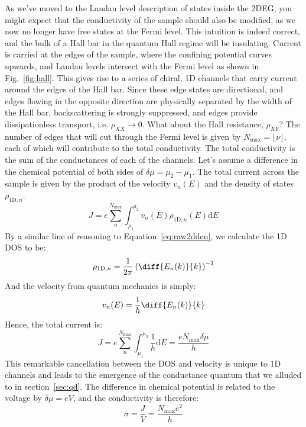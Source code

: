 As we've moved to the Landau level description of states inside the 2DEG, you might expect that the conductivity of the sample should also
be modified, as we now no longer have free states at the Fermi level. This intuition is indeed correct, and the bulk of a Hall bar in the quantum
Hall regime will be insulating. Current is carried at the edges of the sample, where the confining potential curves upwards, and Landau levels
intersect with the Fermi level \cite{PhysRevB.25.2185} as shown in Fig.~\ref{fig:hall}. This gives rise to a series of chiral, 1D channels that carry current around the edges
of the Hall bar. Since these edge states are directional, and edges flowing in the opposite direction are physically separated by the width of the Hall
bar, backscattering is strongly suppressed, and edges provide dissipationless transport, i.e. $\rho_{XX} \rightarrow 0$. What about
the Hall resistance, $\rho_{XY}$? The number of edges that will cut through the Fermi level is given by $N_\textrm{max} = \lfloor \nu \rfloor$, each of which
will contribute to the total conductivity. The total conductivity is the sum of the conductances of each of the channels. Let's assume a difference in the
chemical potential of both sides of $\delta \mu = \mu_2 - \mu_1$. The total current across the sample is given by the product of the velocity $v_n(E)$ and the density of states $\rho_{\textrm{1D},n}$.
\begin{equation}
  J = e\sum_n^{N_{\textrm{max}}} \int_{\mu_1}^{\mu_2} v_n(E)\rho_{\textrm{1D},n}(E) \mathrm{d}E
\end{equation}
By a similar line of reasoning to Equation~\ref{eq:raw2dden}, we calculate the 1D DOS to be:
\begin{equation}
  \rho_{\textrm{1D},n} = \frac{1}{2\pi}\left(\diff{E_n(k)}{k}\right)^{-1}
\end{equation}
And the velocity from quantum mechanics is simply:
\begin{equation}
  v_n(E) = \frac{1}{\hbar}\diff{E_n(k)}{k}
\end{equation}
Hence, the total current is:
\begin{equation}
  J = e\sum_n^{N_{\textrm{max}}} \int_{\mu_1}^{\mu_2} \frac{1}{h} \mathrm{d}E = \frac{e N_{\textrm{max}} \delta\mu}{h}
\end{equation}
This remarkable cancellation between the DOS and velocity is unique to 1D channels and leads to the emergence of the conductance quantum that
we alluded to in section~\ref{sec:qd}. The difference in chemical potential is related to the voltage by $\delta \mu = eV$, and the conductivity is therefore:
\begin{equation}
  \sigma = \frac{J}{V} = \frac{N_{\textrm{max}} e^2}{h}
  \label{eq:hallsigma}
\end{equation}

